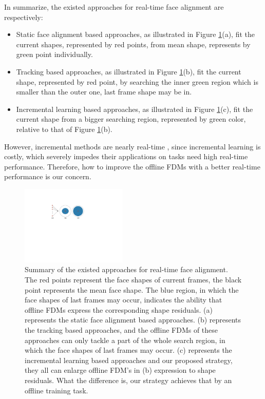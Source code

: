 \documentclass[a4paper, 10pt, conference]{ieeeconf}      %
\begin{document}
In summarize, the existed approaches for real-time face alignment are respectively:
\begin{itemize}
    \item Static face alignment based approaches, as illustrated in Figure \ref{fig:niubility}(a), fit the current shapes, represented by red points, from mean shape,
          represents by green point individually.
      \item Tracking based approaches, as illustrated in Figure \ref{fig:niubility}(b), fit the current shape, represented by red point, by searching the inner green
          region which is smaller than the outer one, last frame shape may be in.
    \item Incremental learning based approaches, as illustrated in Figure \ref{fig:niubility}(c), fit the current shape from a bigger searching region, represented by
          green color, relative to that of Figure \ref{fig:niubility}(b).
\end{itemize}
However, incremental methods are nearly real-time \cite{sanchez2016cascaded}, since incremental learning is costly, which severely impedes
their applications on tasks need high real-time performance. Therefore, how to improve the offline FDMs with a better real-time performance is our
concern.
\begin{figure}
        \centering
        \includegraphics[width=0.45\textwidth]{niubility.pdf}%
        \caption{
        Summary of the existed approaches for real-time face alignment. The red points represent the face shapes of current frames, the black point
        represents the mean face shape. The blue region, in which the face shapes of last frames may occur, indicates the ability that
        offline FDMs express the corresponding shape residuals. (a) represents the static face alignment based approaches. (b) represents the tracking
        based approaches, and the offline FDMs of these approaches can only tackle a part of the whole search region, in which the face shapes of
        last frames may occur. (c) represents the incremental learning based approaches and our proposed strategy, they all can enlarge offline FDM's in (b)
        expression to shape residuals. What the difference is, our strategy achieves that by an offline training task.
        }
        \label{fig:niubility}
\end{figure}
\end{document}
